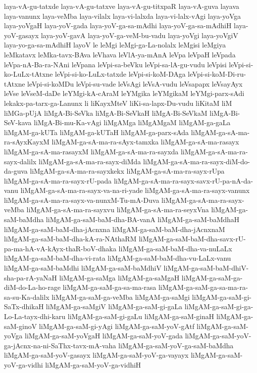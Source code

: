 {laya-vA-gu-tatxde
laya-vA-gu-tatxve
laya-vA-gu-titxpaR
laya-vA-guva
layava
laya-vanunx
laya-veMba
laya-vilalx
laya-vi-lalxda
laya-vi-lalx-vAgi
laya-yoVga
laya-yoVgaH
laya-yoV-gada
laya-yoV-ga-sa-mAdhi
laya-yoV-ga-sa-mAdhiH
laya-yoV-gasayx
laya-yoV-gavA
laya-yoV-ga-veM-bu-vadu
laya-yoVgi
laya-yoVgiV
laya-yo-ga-sa-mAdhiH
layoV
le
leMgi
leMgi-ga-La-nolalx
leMgisi
leMgiya
leMkatavx
leMka-tavx-BAva
leVhava
leVlA-ya-mAnA
leVpa
leVpaH
leVpada
leVpa-nA-Ba-ra-NAni
leVpana
leVpi-sa-beVku
leVpi-sa-lA-gu-vudu
leVpisi
leVpi-si-ko-LuLx-tAtxne
leVpi-si-ko-LuLx-tatxde
leVpi-si-koM-DAga
leVpi-si-koM-Di-ru-tAtxne
leVpi-si-koMDu
leVpi-su-vade
leVsAgi
leVsA-vudu
leVsapapx
leVsayAyx
leVse
leVseM-daDe
leYMgi-kA-cAraM
leYMgika
leYMgikaM
leYMgi-parx-sAdi
lekakx-pa-tarx-ga-Lanunx
li
liKayxMteV
liKi-sa-lapx-Du-vudu
liKitaM
liM
liMGa-pUjA
liMgA-Bi-SeVka
liMgA-Bi-SeVkaH
liMgA-Bi-SeVkaM
liMgA-Bi-SeV-kava
liMgA-Bi-mu-Ka-vAgi
liMgAMga
liMgAMgaM
liMgAM-ga-gaLa
liMgAM-ga-kUTa
liMgAM-ga-kUTaH
liMgAM-ga-parx-sAda
liMgAM-ga-sA-ma-ra-sAyxKayxM
liMgAM-ga-sA-ma-ra-sAyx-tamxka
liMgAM-ga-sA-ma-rasayx
liMgAM-ga-sA-ma-rasayxM
liMgAM-ga-sA-ma-ra-sayxda
liMgAM-ga-sA-ma-ra-sayx-dalilx
liMgAM-ga-sA-ma-ra-sayx-diMda
liMgAM-ga-sA-ma-ra-sayx-diM-do-da-guva
liMgAM-ga-sA-ma-ra-sayxkekx
liMgAM-ga-sA-ma-ra-sayx-rUpa
liMgAM-ga-sA-ma-ra-sayx-rU-pada
liMgAM-ga-sA-ma-ra-sayx-savx-rU-pa-nA-da-vanu
liMgAM-ga-sA-ma-ra-sayx-va-na-ri-yade
liMgAM-ga-sA-ma-ra-sayx-vanunx
liMgAM-ga-sA-ma-ra-sayx-va-nunxM-Tu-mA-Duva
liMgAM-ga-sA-ma-ra-sayx-veMba
liMgAM-ga-sA-ma-ra-sayxvu
liMgAM-ga-sA-ma-ra-seyxVna
liMgAM-ga-saM-baMdha
liMgAM-ga-saM-baM-dha-BA-vanA
liMgAM-ga-saM-baMdhaH
liMgAM-ga-saM-baM-dha-jAcnxna
liMgAM-ga-saM-baM-dha-jAcnxnaM
liMgAM-ga-saM-baM-dha-kA-ra-NAthaRM
liMgAM-ga-saM-baM-dha-savx-rU-pa-ma-hA-vA-kAyx-thaR-boV-dhaka
liMgAM-ga-saM-baM-dha-va-nuLaLx
liMgAM-ga-saM-baM-dha-vi-rata
liMgAM-ga-saM-baM-dha-vu-LaLx-vanu
liMgAM-ga-saM-baMdhi
liMgAM-ga-saM-baMdhiV
liMgAM-ga-saM-baM-dhiV-sha-pa-rA-yaNaH
liMgAM-ga-saMga
liMgAM-ga-saMgaH
liMgAM-ga-saM-ga-diM-do-La-ho-rage
liMgAM-ga-saM-ga-sa-ma-rasa
liMgAM-ga-saM-ga-sa-ma-ra-sa-su-Ka-dalilx
liMgAM-ga-saM-ga-veMba
liMgAM-ga-saMgi
liMgAM-ga-saM-gi-SaTx-dhikaH
liMgAM-ga-saMgiV
liMgAM-ga-saM-gi-gaLa
liMgAM-ga-saM-gi-ga-Lo-La-tayx-dhi-karu
liMgAM-ga-saM-gi-gaLu
liMgAM-ga-saM-ginaH
liMgAM-ga-saM-ginoV
liMgAM-ga-saM-gi-yAgi
liMgAM-ga-saM-yoV-gAtf
liMgAM-ga-saM-yoVga
liMgAM-ga-saM-yoVgaH
liMgAM-ga-saM-yoV-gada
liMgAM-ga-saM-yoV-ga-jAcnx-na-ni-SaThx-tavx-mA-vaha
liMgAM-ga-saM-yoV-ga-saM-baMdha
liMgAM-ga-saM-yoV-gasayx
liMgAM-ga-saM-yoV-ga-vayayx
liMgAM-ga-saM-yoV-ga-vidhi
liMgAM-ga-saM-yoV-ga-vidhiH
}
